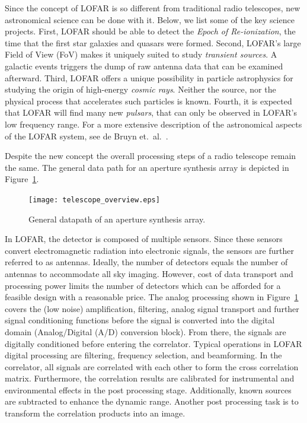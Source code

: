 \documentclass[journal]{IEEEtran}
\begin{document}
Since the concept of LOFAR is so different from traditional radio telescopes,
new astronomical science can be done with it.
Below, we list some of the key science projects.
First, LOFAR should be able to detect the {\em Epoch of Re-ionization},
the time that the first star galaxies and quasars were formed.
Second, LOFAR's large Field of View (FoV) makes it uniquely suited to study
{\em transient sources}.
A galactic events triggers the dump of raw antenna data that can be examined
afterward.
Third, LOFAR offers a unique possibility in particle astrophysics for
studying the origin of high-energy {\em cosmic rays}.
Neither the source, nor the physical process that accelerates such particles
is known.
Fourth, it is expected that LOFAR will find many new {\em pulsars}, that can
only be observed in LOFAR's low frequency range.
For a more extensive description of the astronomical aspects of the LOFAR
system, see de Bruyn et.~al.~\cite{Bruyn:02}.

Despite the new concept the overall processing steps of a radio telescope remain the same. The general data path for an aperture synthesis array is depicted in Figure~\ref{fig:concept}.

\begin{figure}
\begin{center}
\texttt{[image: telescope\_overview.eps]}
\end{center}
\caption{General datapath of an aperture synthesis array.}
\label{fig:concept}
\end{figure}

In LOFAR, the detector is composed of multiple sensors. Since these sensors convert electromagnetic radiation into electronic signals, the sensors are further referred to as antennas. Ideally, the number of detectors equals the number of antennas to accommodate all sky imaging. However, cost of data transport and processing power limits the number of detectors which can be afforded for a feasible design with a reasonable price. The analog processing shown in Figure~\ref{fig:concept} covers the (low noise) amplification, filtering, analog signal transport and further signal conditioning functions before the signal is converted into the digital domain (Analog/Digital (A/D) conversion block). From there, the signals are digitally conditioned before entering the correlator. Typical operations in LOFAR digital processing are filtering, frequency selection, and beamforming. In the correlator, all signals are correlated with each other to form the cross correlation matrix. Furthermore, the correlation results are calibrated for instrumental and environmental effects in the post processing stage. Additionally, known sources are subtracted to enhance the dynamic range. Another post processing task is to transform the correlation products into an image.
\end{document}
